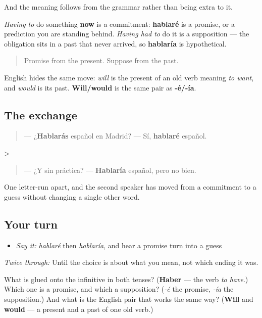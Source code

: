 \begin{grammarlens}[title={What you've built}]
And the meaning follows from the grammar rather than being extra to it.

\emph{Having to} do something \textbf{now} is a commitment: \textbf{hablaré} is a promise, or a prediction you are standing behind. \emph{Having had to} do it is a supposition — the obligation sits in a past that never arrived, so \textbf{hablaría} is hypothetical.

\begin{quote}
Promise from the present. Suppose from the past.
\end{quote}

English hides the same move: \emph{will} is the present of an old verb meaning \emph{to want}, and \emph{would} is its past. \textbf{Will/would} is the same pair as \textbf{-é/-ía}.
\end{grammarlens}

\subsection*{The exchange}
\begin{quote}
— ¿\textbf{Hablarás} español en Madrid? — Sí, \textbf{hablaré} español.
\end{quote}

>

\begin{quote}
— ¿Y sin práctica? — \textbf{Hablaría} español, pero no bien.
\end{quote}

One letter-run apart, and the second speaker has moved from a commitment to a guess without changing a single other word.

\subsection*{Your turn}
\begin{itemize}
\raggedright
  \item \emph{Say it:} \emph{hablaré} then \emph{hablaría}, and hear a promise turn into a guess
\end{itemize}

\emph{Twice through:} Until the choice is about what you mean, not which ending it was.

\begin{tcolorbox}[breakable,colback=teal!4,colframe=teal!35!black,title={Before you move on}]
What is glued onto the infinitive in both tenses? (\textbf{Haber} — the verb \emph{to have}.) Which one is a promise, and which a supposition? (\emph{-é} the promise, \emph{-ía} the supposition.) And what is the English pair that works the same way? (\textbf{Will} and \textbf{would} — a present and a past of one old verb.)
\end{tcolorbox}
